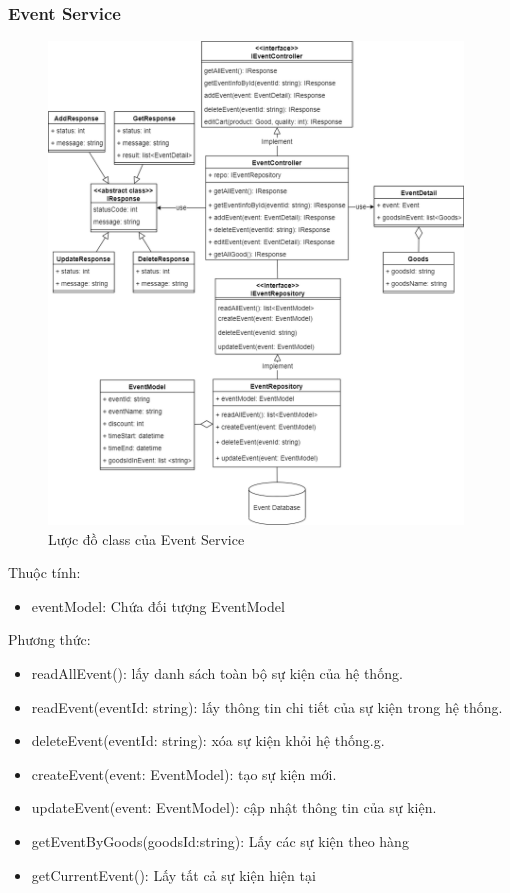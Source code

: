 \newpage


\subsubsection{Event Service}
\begin{figure}[!htp]
	\centering
	\includegraphics[width=11cm]{img/Architecture/service/EventService.png}
	\newline
	\caption{Lược đồ class của Event Service}
\end{figure}

Thuộc tính:
\begin{itemize}
	\item eventModel: Chứa đối tượng EventModel
\end{itemize}
Phương thức:
\begin{itemize}
	\item readAllEvent(): lấy danh sách toàn bộ sự kiện của hệ thống.
	\item readEvent(eventId: string): lấy thông tin chi tiết của sự kiện trong hệ thống.
	\item deleteEvent(eventId: string): xóa sự kiện khỏi hệ thống.g.
	\item createEvent(event: EventModel): tạo sự kiện mới.
	\item updateEvent(event: EventModel): cập nhật thông tin của sự kiện.
	\item getEventByGoods(goodsId:string): Lấy các sự kiện theo hàng
	\item getCurrentEvent(): Lấy tất cả sự kiện hiện tại
\end{itemize}

